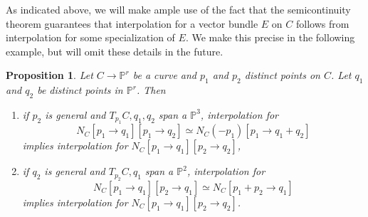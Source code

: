 \documentclass[11pt]{amsart}
\newcommand{\pp}{\mathbb{P}}
\newtheorem{prop}[thm]{Proposition}
\theoremstyle{definition}
\theoremstyle{remark}
\begin{document}
As indicated above, we will make ample use of the fact that the semicontinuity theorem guarantees that interpolation for a vector bundle $E$ on $C$ follows from interpolation for some specialization of $E$.  We make this precise in the following example, but will omit these details in the future.

\begin{prop}\label{limit}
Let $C \to \pp^r$ be a curve and $p_1$ and $p_2$ distinct points on $C$.  Let $q_1$ and $q_2$ be distinct points in $\pp^r$.  Then 
\begin{enumerate}
\item if $p_2$ is general and $T_{p_1}C, q_1, q_2$ span a $\pp^3$, interpolation for 
\[N_C[p_1 \to q_1][p_1 \to q_2] \simeq N_C(-p_1)[p_1 \to q_1 + q_2]\]
implies interpolation for $N_C[p_1 \to q_1][p_2 \to q_2]$,
\item if $q_2$ is general and $T_{p_2}C, q_1$ span a $\pp^2$, interpolation for
\[N_C[p_1 \to q_1][p_2 \to q_1] \simeq N_C[p_1 + p_2 \to q_1]\]
implies interpolation for $N_C[p_1 \to q_1][p_2 \to q_2]$.
\end{enumerate}
\end{prop}
\end{document}
